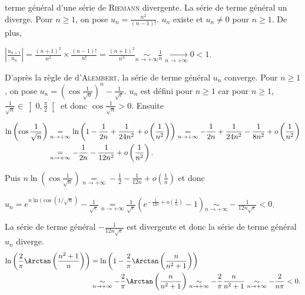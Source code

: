 {{terme général d'une série de \textsc{Riemann} divergente. La série de terme général un diverge.
Pour $n\geqslant1$, on pose $u_n=\frac{n^2}{(n-1)!}$. $u_n$ existe  et $u_n \neq0$ pour $n\geqslant1$. De plus,

\begin{center}
$\left|\frac{u_{n+1}}{u_n}\right|=\frac{(n+1)^2}{n^2}\times\frac{(n-1)!}{n!}=\frac{(n+1)^2}{n^3}  \underset{n\rightarrow+\infty}{\sim}\frac{1}{n}\underset{n\rightarrow+\infty}{\rightarrow}0< 1$.
\end{center}

D'après la règle de d'\textsc{Alembert}, la série de terme général $u_n$ converge.
Pour $n\geqslant1$, on pose $u_n=\left(\cos\frac{1}{\sqrt{n}}\right)^n-\frac{1}{\sqrt{e}}$. $u_n$ est défini pour $n\geqslant1$ car pour $n\geqslant1$, $\frac{1}{\sqrt{n}}\in\left]0,\frac{\pi}{2}\right[$ et donc $\cos\frac{1}{\sqrt{n}}>0$. Ensuite

\begin{align*}\ensuremath
\ln\left(\cos\frac{1}{\sqrt{n}}\right)&\underset{n\rightarrow+\infty}{=}\ln\left(1-\frac{1}{2n}+\frac{1}{24n^2}+o\left(\frac{1}{n^2}\right)\right)\underset{n\rightarrow+\infty}{=}-\frac{1}{2n}+\frac{1}{24n^2}-\frac{1}{8n^2}+o\left(\frac{1}{n^2}\right)\\
 &\underset{n\rightarrow+\infty}{=}-\frac{1}{2n}-\frac{1}{12n^2}+o\left(\frac{1}{n^2}\right).
\end{align*}

Puis $n\ln\left(\cos\frac{1}{\sqrt{n}}\right)\underset{n\rightarrow+\infty}{=}-\frac{1}{2}-\frac{1}{12n}+o\left(\frac{1}{n}\right)$ et donc

\begin{center}
$u_n=e^{n\ln(\cos(1/\sqrt{n})}-\frac{1}{\sqrt{e}}\underset{n\rightarrow+\infty}{=}\frac{1}{\sqrt{e}}\left(e^{-\frac{1}{12n}+o\left(\frac{1}{n}\right)}-1\right)\underset{n\rightarrow+\infty}{\sim}-\frac{1}{12n\sqrt{e}}<0$.
\end{center}

La série de terme général $-\frac{1}{12n\sqrt{e}}$ est  divergente et donc la série de terme général $u_n$ diverge.
\begin{align*}\ensuremath
\ln\left(\frac{2}{\pi}\Arctan\left(\frac{n^2+1}{n}\right)\right)&=\ln\left(1-\frac{2}{\pi}\Arctan\left(\frac{n}{n^2+1}\right)\right)\\
 &\underset{n\rightarrow+\infty}{\sim}-\frac{2}{\pi}\Arctan\left(\frac{n}{n^2+1}\right)\underset{n\rightarrow+\infty}{\sim}-\frac{2}{\pi}\frac{n}{n^2+1}\underset{n\rightarrow+\infty}{\sim}-\frac{2}{n\pi}<0.
\end{align*}

}}
